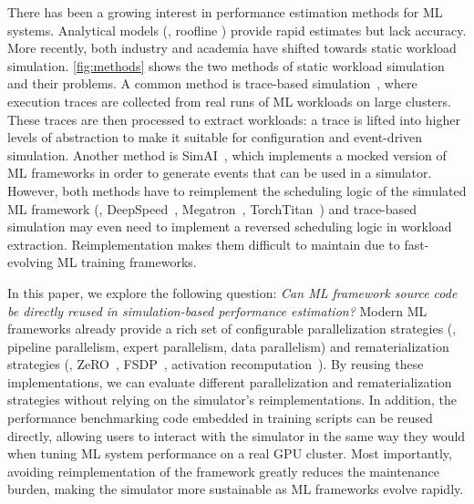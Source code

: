 There has been a growing interest in performance estimation methods for ML systems. Analytical models (\eg, roofline \cite{roofline}) provide rapid estimates but lack accuracy. More recently, both industry and academia have shifted towards static workload simulation. \autoref{fig:methods} shows the two methods of static workload simulation and their problems. A common method is trace-based simulation~\cite{astrasim, astrasim2,daydream,dpro,flexflow,distsim,bang2024vtrain,gui2025multiverse}, where execution traces are collected from real runs of ML workloads on large clusters. These traces are then processed to extract workloads: 
a trace is lifted into higher levels of abstraction to make it suitable for configuration and event-driven simulation.  
Another method is SimAI~\cite{wang2025simai}, which implements a mocked version of ML frameworks in order to generate events that can be used in a simulator. However, both methods have to reimplement the scheduling logic of the simulated ML framework (\eg, DeepSpeed~\cite{rasley2020deepspeed}, Megatron~\cite{shoeybi2019megatron}, TorchTitan~\cite{liang2025torchtitan}) and trace-based simulation may even need to implement a reversed scheduling logic in workload extraction.
Reimplementation makes them difficult to maintain due to fast-evolving ML training frameworks.


In this paper, we explore the following question: \textit{Can ML framework source code be directly reused in simulation-based performance estimation?}
Modern ML frameworks already provide a rich set of configurable parallelization strategies (\eg, pipeline parallelism, expert parallelism, data parallelism) and rematerialization strategies (\eg, ZeRO~\cite{rajbhandari2020zero}, FSDP~\cite{zhao2023pytorchfsdpexperiencesscaling}, activation recomputation~\cite{korthikanti2023ac}). By reusing these implementations, we can evaluate different parallelization and rematerialization strategies without relying on the simulator’s reimplementations. In addition, the performance benchmarking code embedded in training scripts can be reused directly, allowing users to interact with the simulator in the same way they would when tuning ML system performance on a real GPU cluster. Most importantly, avoiding reimplementation of the framework greatly reduces the maintenance burden, making the simulator more sustainable as ML frameworks evolve rapidly.


